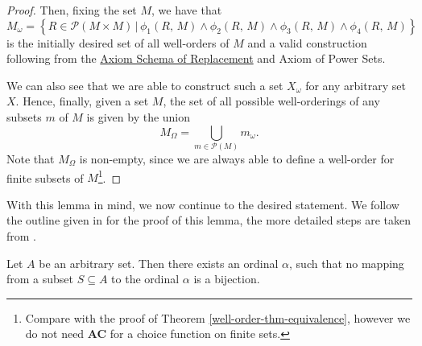 \documentclass[../../main.tex]{subfiles}
\begin{document}
\begin{proof}
    Then, fixing the set $M$, we have that
    $$M_\omega = \left\{R \in \mathcal{P}(M \times M) \,\vert\, \phi_1(R,\, M) \wedge \phi_2(R,\, M) \wedge \phi_3(R,\, M) \wedge \phi_4(R,\, M)\right\}$$
    is the initially desired set of all well-orders of $M$ and a valid construction following from the \hyperref[ZF3]{Axiom Schema of Replacement} and Axiom of Power Sets.
    
    We can also see that we are able to construct such a set $X_\omega$ for any arbitrary set $X$.
    Hence, finally, given a set $M$, the set of all possible well-orderings of any subsets $m$ of $M$ is given by the union
    $$M_\Omega = \bigcup_{m \in \mathcal{P}(M)} m_\omega.$$
    Note that $M_\Omega$ is non-empty, since we are always able to define a well-order for finite subsets of $M$\footnote{
        Compare with the proof of Theorem \ref{well-order-thm-equivalence}, however we do not need \textbf{AC} for a choice function on finite sets.
    }.
\end{proof}

With this lemma in mind, we now continue to the desired statement.
We follow the outline given in \cite{Haj72} for the proof of this lemma, the more detailed steps are taken from \cite{Har15}.

\begin{lemma}\label{hartogs-lemma}\cite{Har15}\cite[Lemma]{Haj72}
    Let $A$ be an arbitrary set.
    Then there exists an ordinal $\alpha$, such that no mapping from a subset $S \subseteq A$ to the ordinal $\alpha$ is a bijection.
\end{lemma}
\end{document}
